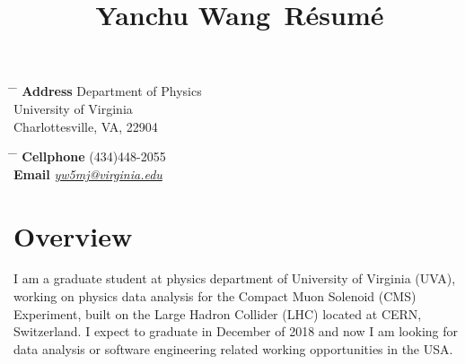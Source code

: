 \documentclass[14pt]{article} %
\begin{document}

\title{Yanchu Wang\, \small{Résumé}} %


\parbox{0.5\textwidth}{ %
\begin{tabbing} %
\hspace{3cm} \= \hspace{4cm} \= \kill %
{\bf Address} \> Department of Physics \\
\> University of Virginia\\ %
\> Charlottesville, VA, 22904 \\ %

\end{tabbing}}
\hfill %
\parbox{0.5\textwidth}{ %
\begin{tabbing} %
\hspace{3cm} \= \hspace{4cm} \= \kill %
{\bf Cellphone} \> (434)448-2055 \\ %
{\bf Email} \> \href{mailto:yw5mj@virginia.edu}{\textit{yw5mj@virginia.edu}} \\ %
\end{tabbing}}


\section{Overview}

I am a graduate student at physics department of University of Virginia (UVA), working on physics data analysis for the Compact Muon Solenoid (CMS) Experiment, built on the Large Hadron Collider (LHC) located at CERN, Switzerland. I expect to graduate in December of 2018 and now I am looking for data analysis or software engineering related working opportunities in the USA.
\end{document}
